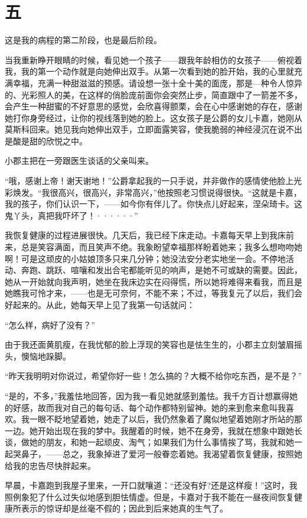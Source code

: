 \documentclass[12pt, UTF8]{ctexbook}
\begin{document}
\section*{五}
\par 这是我的病程的第二阶段，也是最后阶段。
\par 当我重新睁开眼睛的时候，看见她一个孩子——跟我年龄相仿的女孩子——俯视着我，我的第一个动作就是向她伸出双手。从第一次看到她的脸开始，我的心里就充满幸福，充满一种甜滋滋的预感。请设想一张十全十美的面庞，那是—种令人惊异的、光彩照人的美，在这样的俏脸庞前面你会突然止步，简直跟中了一箭差不多，会产生一种甜蜜的不好意思的感觉，会欣喜得颤栗，会在心中感谢她的存在，感谢她打你身旁经过，让你的视线落到她的脸上。这女孩子是公爵的女儿卡嘉，她刚从莫斯科回来。她见我向她伸出双手，立即面露笑容，使我脆弱的神经浸沉在说不出是酸是甜的欣悦之中。
\par 小郡主把在一旁跟医生谈话的父亲叫来。
\par “哦，感谢上帝！谢天谢地！”公爵拿起我的一只手说，并非做作的感情使他脸上光彩焕发。“我很高兴，很高兴，非常高兴，”他按照老习惯说得很快。“这就是卡嘉，我的孩子，你们认识一下，——如今你有伴儿了。你快点儿好起来，涅朵琦卡。这鬼丫头，真把我吓坏了！······”
\par 我恢复健康的过程进展很快。几天后，我已经下床走动。卡嘉每天早上到我床前来，总是笑容满面，而且笑声不绝。我象盼望幸福那样盼着她来；我多么想吻吻她啊！可是这顽皮的小姑娘顶多只来几分钟；她没法安分老实地坐一会。不停地活动、奔跑、跳跃、喧嚷和发出合宅都能听见的响声，是她不可或缺的需要。因此，她从一开始就向我声明，她坐在我床边实在闷得慌，所以她将难得来看我，而且是她瞧我可怜才来，——也是无可奈何，不能不来；不过，等我复元了以后，我们会好起来的。从此，她每天早上见了我第一句话就问：
\par “怎么样，病好了没有？”
\par 由于我还面黄肌瘦，在我忧郁的脸上浮现的笑容也是怯生生的，小郡主立刻皱眉摇头，懊恼地跺脚。
\par “昨天我明明对你说过，希望你好一些！怎么搞的？大概不给你吃东西，是不是？”
\par “是的，不多，”我羞怯地回答，因为我一看见她就感到羞怯。我千方百计想赢得她的好感，故而我对自己的每句话、每个动作都特别留神。她的来到愈来愈叫我喜欢。我一眼不眨地望着她，她走了以后，我仍然象着了魔似地望着她刚才所站的那一边。她开始出现在我的梦中。我醒着的时候，她不在身旁，我就在想象中跟她长谈，做她的朋友，和她一起顽皮、淘气；如果我们为什么事情挨了骂，我就和她一起哭鼻子，——总之，我象掉进了爱河一般眷恋着她。我渴望着恢复健康，按照她给我的忠告尽快胖起来。
\par 早晨，卡嘉跑到我屋子里来，一开口就嚷道：“还没有好?还是这样瘦！”这时，我照例象犯了什么过失似地感到胆怯情虚。但是，卡嘉对于我不能在一昼夜间恢复健康所表示的惊讶却是丝毫不假的；因此到后来她真的生气了。
\end{document}
